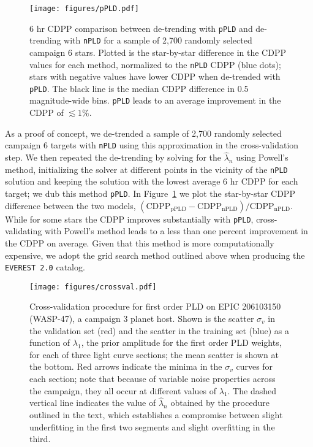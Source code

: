 \documentclass[]{emulateapj}
\begin{document}
\begin{figure}[hbt]
  \begin{center}
      \texttt{[image: figures/pPLD.pdf]}
       \caption{6 hr CDPP comparison between de-trending with \texttt{pPLD} and
                de-trending with \texttt{nPLD} for a sample of 2,700 randomly selected campaign 6
                stars. Plotted is the star-by-star difference in the CDPP values for each method,
                normalized to the \texttt{nPLD} CDPP (blue dots); stars with negative values have lower CDPP
                when de-trended with \texttt{pPLD}. The black line is the median CDPP difference
                in 0.5 magnitude-wide bins. \texttt{pPLD} leads to an average improvement
                in the CDPP of ${\lesssim}1\%$.}
     \label{fig:pPLD}
  \end{center}
\end{figure}

As a proof of concept, we de-trended a sample of 2,700 randomly selected campaign 6 targets
with \texttt{nPLD} using this approximation in the cross-validation step.
We then repeated the de-trending by
solving for the $\hat{\lambda}_n$ using Powell's method, initializing the solver at different
points in the vicinity of the \texttt{nPLD} solution and keeping the solution with the lowest
average 6 hr CDPP \citep[combined differential photometric precision;][]{Christiansen12} for each target; we dub this method
\texttt{pPLD}. In Figure~\ref{fig:pPLD} we plot
the star-by-star CDPP difference between the two models,
$\mathrm{(CDPP_{pPLD} - CDPP_{nPLD})/CDPP_{nPLD}}$. While for some stars the CDPP improves
substantially with \texttt{pPLD}, cross-validating with Powell's method
leads to a less than one percent improvement in the CDPP on average. Given that this method
is more computationally expensive, we adopt the grid search method outlined above when
producing the \texttt{EVEREST 2.0} catalog.

\begin{figure}[hbt]
  \begin{center}
      \texttt{[image: figures/crossval.pdf]}
       \caption{Cross-validation procedure for first order PLD on EPIC 206103150
       (WASP-47), a campaign 3 planet host. Shown is the scatter $\sigma_v$ in the validation
       set (red) and the scatter in the training set (blue) as a function of $\lambda_1$,
       the prior amplitude for the first order PLD weights, for each of three light curve
       sections; the mean scatter is shown at the bottom. Red arrows indicate the minima
       in the $\sigma_v$ curves for each section; note that because of variable noise
       properties across the campaign, they all occur at different values of $\lambda_1$.
       The dashed vertical line indicates the value of $\hat{\lambda}_n$ obtained by the
       procedure outlined in the text, which establishes a compromise between
       slight underfitting in the first two segments and slight overfitting in the
       third.
       }
     \label{fig:crossval}
  \end{center}
\end{figure}
\end{document}
